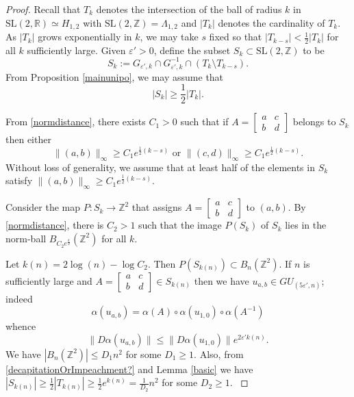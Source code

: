 \documentclass[10pt,reqno]{amsart}
\theoremstyle{Theorem}
\theoremstyle{definition}
\theoremstyle{remark}
\renewcommand{\epsilon}{\varepsilon}
\newcommand{\R}{\mathbb {R}}
\newcommand{\Z}{\mathbb {Z}}
\newcommand{\e}{\epsilon}
\newcommand{\Sl}{\mathrm{SL}}
\newcommand{\inv}{^{-1}}
\def\blue{}
\begin{document}
\begin{proof}
Recall that $T_k$ denotes the intersection of the ball of radius $k$ in $\Sl(2,\R)\simeq H_{1,2}$ with $\Sl(2,\Z)= \Lambda_{1,2}$ and $|T_k|$ denotes the cardinality of $T_k$.  As $|T_k|$ grows exponentially in $k$, we may take
 $s$ fixed  so  that $|T_{k-s}| < \frac{1}{2}|T_{k}|$ for all $k$ sufficiently large. Given $\epsilon '>0$, define the subset $S_k\subset \Sl(2,\Z)$ to be   $$S_k := G_{\e',k}\cap G_{\e',k}\inv \cap  (T_k \setminus T_{k-s}).$$ From Proposition \ref{mainunipo}, we may  assume that $$|S_{k}| \geq \frac{1}{2} |T_k|.$$

From   \eqref{normdistance}, there exists $C_1>0$ such that if $A = \begin{bmatrix} a&c\\b&d \end{bmatrix}$ belongs to $S_k$ then either $$\text{$\|(a,b)\|_\infty \geq C_1e^{ \frac{1}{2}{(k-s)} }$ or $\|(c,d)\|_\infty \geq C_1e^{\frac{1}{2}{(k-s)} }$.}$$ Without loss of generality,   we     assume that at least half of the elements in $S_k$ satisfy   $\|(a,b)\|_\infty \geq C_1e^{ \frac{1}{2}{(k-s)} }$.

Consider the map $P\colon S_{k} \to \Z^2$ that assigns     $A = \begin{bmatrix} a&c\\b&d \end{bmatrix}$ to $(a,b)$. By  \eqref{normdistance},  there is $C_2>1$ such that  the image $P(S_k)$ of $S_k$ lies in the norm-ball $B_{C_2e^{\frac{k}{2}}}(\Z^2)$ for all $k$.

{\blue
 Let $k(n) = 2\log (n)-\log C_2 $. Then $P(S_{k(n)}) \subset B_{n}(\Z^2)$.  If  $n$ is sufficiently large and $A = \begin{bmatrix} a&c\\b&d \end{bmatrix} \in S_{k(n)}$ then  we have $u_{a,b} \in GU_{(5\e',n)}$; indeed $$\alpha (u_{a,b})  =\alpha (A) \circ \alpha (u_{1,0})\circ  \alpha (A\inv)$$
whence $$\|D \alpha (u_{a,b}) \| \le \|D\alpha (u_{1,0})\| e^{2 \epsilon' k(n)}. $$
We have $|B_{   n}(\Z^2)|\le D_1 n^2$ for some $D_1\ge 1$.  Also, from \eqref{decapitationOrImpeachment?} and Lemma \ref{basic} we have   $|S_{k(n)}| \geq \frac{1}{2}|T_{k(n)}| \ge \frac{1}{2} e^{k(n)} = %
\frac 1{D_2}n^2$ for some $D_2\ge 1$.
}



\end{proof}
\end{document}
